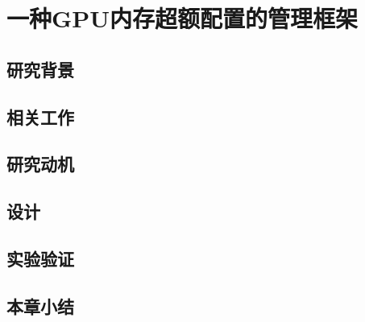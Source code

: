 \chapter{一种GPU内存超额配置的管理框架}
\label{chap:ETC}

\section{研究背景}

\section{相关工作}

\section{研究动机}


\section{设计}

\section{实验验证}

\section{本章小结}

